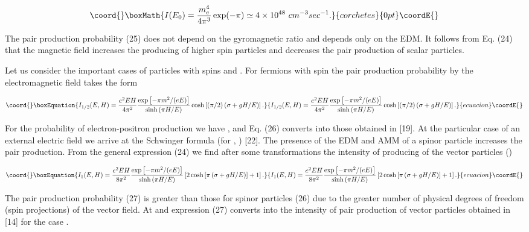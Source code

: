 \documentclass[a4paper,12pt]{article}
\begin{document}
\[\coord{}\boxMath{
I(E_0)=\frac{m_e^4}{4\pi^3}\exp(-\pi)\simeq4\times 10^{48}~cm^{-3}sec^{-1}.
}{corchetes}{0pt}\coordE{}\]

The pair production probability (25) does not depend on the gyromagnetic
ratio \coordHE{} and depends only on the EDM. It follows from Eq. (24) that the
magnetic field increases the producing of higher spin particles and
decreases the pair production of scalar particles.

Let us consider the important cases of particles with spins \coordHE{} and \coordHE{}.
For fermions with spin \coordHE{} the pair production probability by the
electromagnetic field takes the form

\begin{equation}\coord{}\boxEquation{
I_{1/2}(E,H)=\frac{e^2EH}{4\pi ^2}\frac{\exp \left[ -\pi
m^2/(eE)\right] }{ \sinh \left( \pi H/E\right) }\cosh \left[
\left( \pi /2\right) \left( \sigma +gH/E\right) \right].
\label{26}
}{
I_{1/2}(E,H)=\frac{e^2EH}{4\pi ^2}\frac{\exp \left[ -\pi
m^2/(eE)\right] }{ \sinh \left( \pi H/E\right) }\cosh \left[
\left( \pi /2\right) \left( \sigma +gH/E\right) \right].
}{ecuacion}\coordE{}\end{equation}

For the probability of electron-positron production we have \coordHE{},
\coordHE{} and Eq. (26) converts into those obtained in [19]. At
the particular case of an external electric field we arrive at the
Schwinger formula (for \coordHE{}, \coordHE{}) [22]. The presence of
the EDM and AMM of a spinor particle increases the pair
production. From the general expression (24) we find after some
transformations the intensity of producing of the vector particles
(\coordHE{})

\begin{equation}\coord{}\boxEquation{
I_{1}(E,H)=\frac{e^2EH}{8\pi ^2}\frac{\exp \left[ -\pi
m^2/(eE)\right] }{ \sinh \left( \pi H/E\right) }\left[2\cosh
\left[ \pi \left( \sigma +gH/E\right)\right]+1\right].  \label{27}
}{
I_{1}(E,H)=\frac{e^2EH}{8\pi ^2}\frac{\exp \left[ -\pi
m^2/(eE)\right] }{ \sinh \left( \pi H/E\right) }\left[2\cosh
\left[ \pi \left( \sigma +gH/E\right)\right]+1\right].  }{ecuacion}\coordE{}\end{equation}

The pair production probability (27) is greater than those for spinor
particles (26) due to the greater number of physical degrees of freedom
(spin projections) of the vector field. At \coordHE{} and \coordHE{} expression
(27) converts into the intensity of pair production of vector particles
obtained in [14] for the case \coordHE{}.
\end{document}
